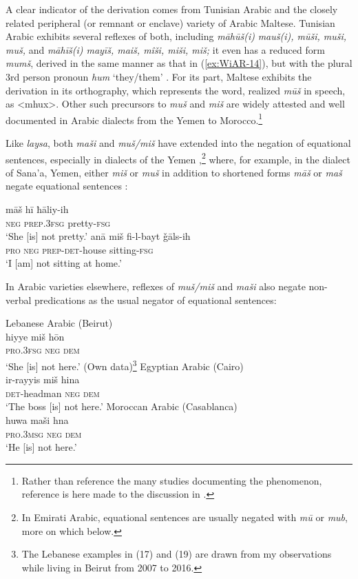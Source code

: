 \documentclass[output=paper]{langsci/langscibook}
\begin{document}
A clear indicator of the derivation comes from Tunisian Arabic and the closely related peripheral (or remnant or enclave) variety of Arabic Maltese. Tunisian Arabic exhibits several reflexes of both, including \textit{māhūš(i)} \textit{mauš(i), mūši, muši, muš,} and \textit{māhīš(i) mayīš, maiš, mîši, miši, miš;} it even has a reduced form \textit{mumš}, derived in the same manner as that in (\ref{ex:WiAR-14}), but with the plural 3rd person pronoun \textit{hum} ‘they/them’ \citep[718]{singer1984a}. For its part, Maltese exhibits the derivation in its orthography, which represents the word, realized \textit{mūš} in speech, as <mhux>. Other such precursors to \textit{muš} and \textit{miš} are widely attested and well documented in Arabic dialects from the Yemen to Morocco.\footnote{Rather than reference the many studies documenting the phenomenon, reference is here made to the discussion in \citet[100--101]{wilmsen2014a}.}

Like \textit{laysa}, both \textit{maši} and \textit{muš/miš} have extended into the negation of equational sentences, especially in dialects of the Yemen \citep[253, 258]{watson1993a},\footnote{In Emirati Arabic, equational sentences are usually negated with \textit{mū} or \textit{mub}, more on which below. } where, for example, in the dialect of Sana’a, Yemen, either \textit{miš} or \textit{muš} in addition to shortened forms \textit{māš} or \textit{maš} negate equational sentences \citep[253--256]{watson1993a}:

\ea \label{ex:WiAR-15}
  \ea
  	\gll māš hī ħāliy-ih\\
  	\textsc{neg} \textsc{prep.3fsg} pretty-\textsc{fsg}\\
  	\glt ‘She [is] not pretty.’ \citep[256]{watson1993a}
  \ex
  	\gll anā miš fi-l-bayt ǧāls-ih\\
  	\textsc{pro} \textsc{neg} \textsc{prep-det}-house sitting-\textsc{fsg}\\
  	\glt ‘I [am] not sitting at home.’ \citep[258]{watson1993a}
\z \z

In Arabic varieties elsewhere, reflexes of \textit{muš/miš} and \textit{maši} also negate non-verbal predications as the usual negator of equational sentences:

\ea \label{ex:WiAR-16}
  \ea Lebanese Arabic (Beirut)\\
  	\gll hiyye miš hōn \\
  	\textsc{pro.3fsg} \textsc{neg} \textsc{dem}\\
  	\glt ‘She [is] not here.’ (Own data)\footnote{The Lebanese examples in (17) and (19) are drawn from my observations while living in Beirut from 2007 to 2016.}
  \ex Egyptian Arabic (Cairo)\\
  	\gll ir-rayyis miš hina\\
  	\textsc{det}-headman \textsc{neg} \textsc{dem}\\
    \glt ‘The boss [is] not here.’ \citep[334]{woidich2006a}
  \ex Moroccan Arabic (Casablanca)\\
  	\gll huwa maši hna \\
  	\textsc{pro.3msg} \textsc{neg} \textsc{dem}\\
  	\glt ‘He [is] not here.’ \citep[155]{harrell2004a}
\z \z
\end{document}
